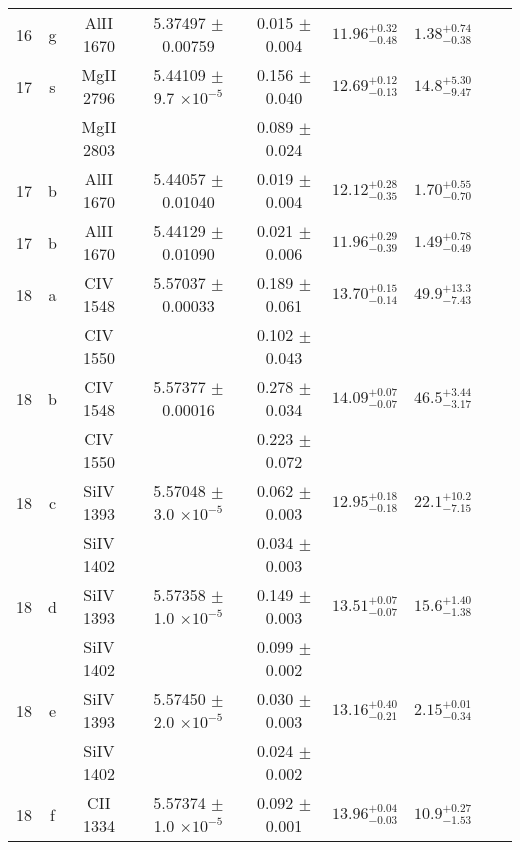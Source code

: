 \documentclass[12pt]{article}
\begin{document}
\begin{footnotesize}
\begin{longtable}{ c c c c c c c c c}
      16  & g  & AlII     1670  &  5.37497 $\pm$ 0.00759  &  0.015 $\pm$ 0.004   & $11.96_{ - 0.48}^{ + 0.32}$  & $1.38_{ - 0.38}^{ + 0.74}$    & 	 & \\ 
      17  & s  & MgII     2796  &  5.44109 $\pm$ 9.7 $\times 10^{-5}$   &  0.156 $\pm$ 0.040   & $12.69_{ - 0.13}^{ + 0.12}$  & $14.8_{ - 9.47}^{ + 5.30}$    & 	 & \\ 
  &   & MgII     2803  &  &  0.089 $\pm$ 0.024   &   &     & 	 & \\ 
      17  & b  & AlII     1670  &  5.44057 $\pm$ 0.01040  &  0.019 $\pm$ 0.004   & $12.12_{ - 0.35}^{ + 0.28}$  & $1.70_{ - 0.70}^{ + 0.55}$    & 	 & \\ 
      17  & b  & AlII     1670  &  5.44129 $\pm$ 0.01090  &  0.021 $\pm$ 0.006   & $11.96_{ - 0.39}^{ + 0.29}$  & $1.49_{ - 0.49}^{ + 0.78}$    & 	 & \\ 
      18  & a  & CIV     1548  &  5.57037 $\pm$ 0.00033  &  0.189 $\pm$ 0.061   & $13.70_{ - 0.14}^{ + 0.15}$  & $49.9_{ - 7.43}^{ + 13.3}$    & 	 & \\ 
  &   & CIV     1550  &  &  0.102 $\pm$ 0.043   &   &     & 	 & \\ 
      18  & b  & CIV     1548  &  5.57377 $\pm$ 0.00016  &  0.278 $\pm$ 0.034   & $14.09_{ - 0.07}^{ + 0.07}$  & $46.5_{ - 3.17}^{ + 3.44}$    & 	 & \\ 
  &   & CIV     1550  &  &  0.223 $\pm$ 0.072   &   &     & 	 & \\ 
      18  & c  & SiIV     1393  &  5.57048 $\pm$ 3.0 $\times 10^{-5}$   &  0.062 $\pm$ 0.003   & $12.95_{ - 0.18}^{ + 0.18}$  & $22.1_{ - 7.15}^{ + 10.2}$    & 	 & \\ 
  &   & SiIV     1402  &  &  0.034 $\pm$ 0.003   &   &     & 	 & \\ 
      18  & d  & SiIV     1393  &  5.57358 $\pm$ 1.0 $\times 10^{-5}$   &  0.149 $\pm$ 0.003   & $13.51_{ - 0.07}^{ + 0.07}$  & $15.6_{ - 1.38}^{ + 1.40}$    & 	 & \\ 
  &   & SiIV     1402  &  &  0.099 $\pm$ 0.002   &   &     & 	 & \\ 
      18  & e  & SiIV     1393  &  5.57450 $\pm$ 2.0 $\times 10^{-5}$   &  0.030 $\pm$ 0.003   & $13.16_{ - 0.21}^{ + 0.40}$  & $2.15_{ - 0.34}^{ + 0.01}$    & 	 & \\ 
  &   & SiIV     1402  &  &  0.024 $\pm$ 0.002   &   &     & 	 & \\ 
      18  & f  & CII     1334  &  5.57374 $\pm$ 1.0 $\times 10^{-5}$   &  0.092 $\pm$ 0.001   & $13.96_{ - 0.03}^{ + 0.04}$  & $10.9_{ - 1.53}^{ + 0.27}$    & 	 & \\ 

\end{longtable}
\end{footnotesize}
\end{document}
